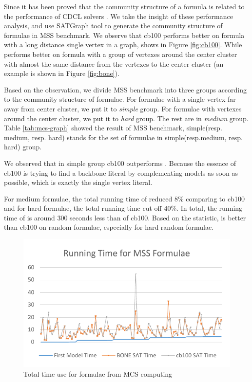 Since it has been proved that the community structure of a formula is related to the performance of CDCL solvers \cite{NZG2014}.
We take the insight of these performance analysis, and use SATGraph \cite{NZW2015} tool to generate the community structure of formulae in MSS benchmark. We observe that cb100 performs better on formula with a long distance single vertex in a graph, shows in Figure \ref{fig:cb100}. While \tool performs better on formula with a group of vertexes around the center cluster with almost the same distance from the vertexes to the center cluster (an example is shown in Figure \ref{fig:bone}).

Based on the observation, we divide MSS benchmark into three groups according to the community structure of formulae. For formulae with a single vertex far away from center cluster, we put it to \emph{simple} group. For formulae with vertexes around the center cluster, we put it to \emph{hard} group. The rest are in \emph{medium} group. Table \ref{tab:mcs-graph} showed the result of MSS benchmark, simple(resp. medium, resp. hard) stands for the set of formulae in simple(resp.medium, resp. hard) group.

We observed that in simple group cb100 outperforms \tool. Because the essence of cb100 is trying to find a backbone literal by complementing models as soon as possible, which is exactly the single vertex literal.

For medium formulae, the total running time of \tool reduced 8\% comparing to cb100 and for hard formulae, the total running time cut off 40\%. In total, the running time of \tool is around 300 seconds less than of cb100. Based on the statistic, \tool is better than cb100 on random formulae, especially for hard random formulae.

\begin{figure}
    \centering
    \includegraphics[scale=0.7]{mcs.pdf}
   \caption{Total time use for formulae from MCS computing}
   \label{fig:mcs-time}
\end{figure}

